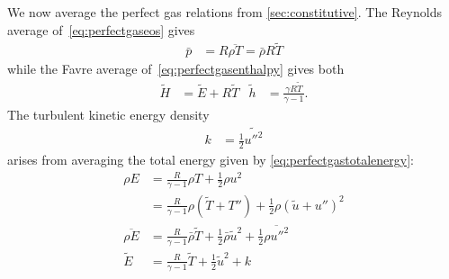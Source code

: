 \documentclass[letterpaper,11pt,nointlimits,reqno,draft]{amsbook}
\begin{document}
We now average the perfect gas relations from \autoref{sec:constitutive}.
The Reynolds average of~\eqref{eq:perfectgaseos} gives
\begin{align}
  \bar{p} &= R\overline{\rho{}T} = \bar{\rho}R\tilde{T}
\end{align}
while the Favre average of~\eqref{eq:perfectgasenthalpy} gives both
\begin{align}
 \tilde{H} &= \tilde{E} + R \tilde{T}
&
 \tilde{h} &= \frac{\gamma{}R\tilde{T}}{\gamma-1}.
\end{align}
The turbulent kinetic energy density
\begin{align}
  k &= \frac{1}{2}\widetilde{{u''}^2}
 \end{align}
arises from averaging the total energy given by
\eqref{eq:perfectgastotalenergy}:
\begin{align}
  \rho{} E
&=
  \frac{R}{\gamma-1} \rho{}T + \frac{1}{2}\rho{} u^{2}
\\
&=
  \frac{R}{\gamma-1} \rho{}\left( \tilde{T} + T'' \right)
+ \frac{1}{2}\rho{} \left( \tilde{u} + u'' \right)^2
\\
  \overline{\rho{}E}
&=
  \frac{R}{\gamma-1} \bar{\rho} \tilde{T}
+ \frac{1}{2}\bar{\rho} \tilde{u}^2
+ \frac{1}{2}\overline{\rho{}{u''}^2}
\\
  \tilde{E}
&=
  \frac{R}{\gamma-1} \tilde{T}
+ \frac{1}{2} \tilde{u}^2
+ k
\end{align}
\end{document}
